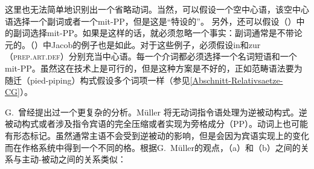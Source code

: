 \begin{exe}
\begin{xlist}[iv.]
\begin{exe}
\begin{xlist}[iv.]
\zl
这里也无法简单地识别出一个省略动词。当然，可以假设一个空中心语，该空中心语选择一个副词或者一个mit-PP，但是这是“特设的”。
另外，还可以假设（）中的副词选择mit-PP。如果是这样的话，就必须忽略一个事实：副词通常是不带论元的。（）中Jacob的例子也是如此。对于这些例子，必须假设in和zur（\textsc{prep}.\textsc{art}.\textsc{def}）分别充当中心语。每一个介词都必须选择一个名词短语和一个mit-PP。虽然这在技术上是可行的，但是这种方案是不好的，正如范畴语法要为随迁（pied-piping）构式假设多个词项一样（参见\ref{Abschnitt-Relativsaetze-CG}）。

G.\  \citet{GMueller2009a}曾经提出过一个更复杂的分析。Müller 将无动词指令语处理为逆被动构式。逆被动构式或者涉及指令宾语的完全压缩或者实现为旁格成分（PP）。动词上也可能有形态标记。虽然通常主语不会受到逆被动的影响，但是会因为宾语实现上的变化而在作格系统中得到一个不同的格。根据G.\ Müller的观点，（a）和（b）之间的关系与主动-被动之间的关系类似：


\end{xlist}
\end{exe}
\end{xlist}
\end{exe}
